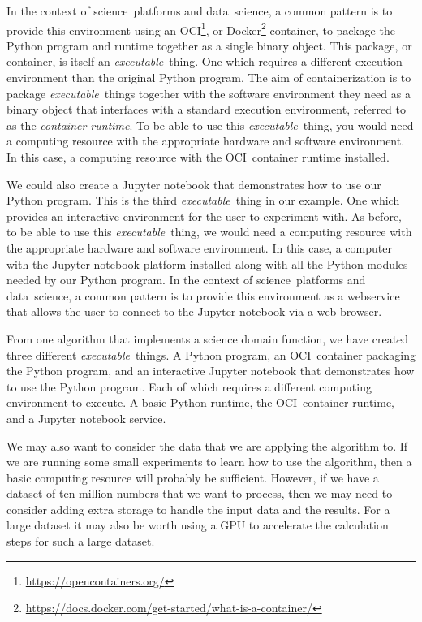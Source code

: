 \documentclass[11pt,a4paper]{ivoa}
\newcommand{\webservice} {webservice}
\newcommand{\webbrowser} {web browser}
\newcommand{\jupyternotebook} {Jupyter notebook}
\newcommand{\python} {Python}
\newcommand{\pythonprogram} {Python program}
\newcommand{\ocicontainer} {OCI~container}
\newcommand{\footurl}[1] {\footnote{\url{#1}}}
\newcommand{\dataset} {dataset}
\newcommand{\datascience} {data~science}
\newcommand{\scienceplatform} {science~platform}
\newcommand{\executablething} {\textit{executable}~thing}
\newcommand{\gpu} {GPU}
\begin{document}
In the context of \scienceplatform{}s and \datascience{}, a common pattern is to provide this environment
using an OCI\footurl{https://opencontainers.org/},
or Docker\footurl{https://docs.docker.com/get-started/what-is-a-container/} container,
to package the \pythonprogram{} and runtime together as a single binary object.
This package, or container, is itself an \executablething{}. One which requires a different execution
environment than the original \pythonprogram{}.
The aim of containerization is to package \executablething{}s together with the software environment
they need as a binary object that interfaces with a standard execution environment,
referred to as the \textit{container runtime}.
To be able to use this \executablething{}, you would need a computing resource with the appropriate
hardware and software environment. In this case, a computing resource with the \ocicontainer{} runtime installed.

We could also create a \jupyternotebook{} that demonstrates how to use our \pythonprogram{}.
This is the third \executablething{} in our example.
One which provides an interactive environment for the user to experiment with.
As before, to be able to use this \executablething{}, we would need a computing resource with
the appropriate hardware and software environment.
In this case, a computer with the \jupyternotebook{} platform installed along with all the \python{} modules
needed by our \pythonprogram{}.
In the context of \scienceplatform{}s and \datascience{}, a common pattern is to provide this environment as a \webservice{}
that allows the user to connect to the \jupyternotebook{} via a \webbrowser.

From one algorithm that implements a science domain function, we have created three different \executablething{}s.
A \pythonprogram{}, an \ocicontainer{} packaging the \pythonprogram{}, and an interactive \jupyternotebook{}
that demonstrates how to use the \pythonprogram{}.
Each of which requires a different computing environment to execute.
A basic \python{} runtime, the \ocicontainer{} runtime, and a \jupyternotebook{} service.

We may also want to consider the data that we are applying the algorithm to.
If we are running some small experiments to learn how to use the algorithm, then a basic computing
resource will probably be sufficient.
However, if we have a \dataset{} of ten million numbers that we want to process, then we may
need to consider adding extra storage to handle the input data and the results.
For a large \dataset{} it may also be worth using a \gpu{} to accelerate the calculation steps
for such a large \dataset{}.
\end{document}
